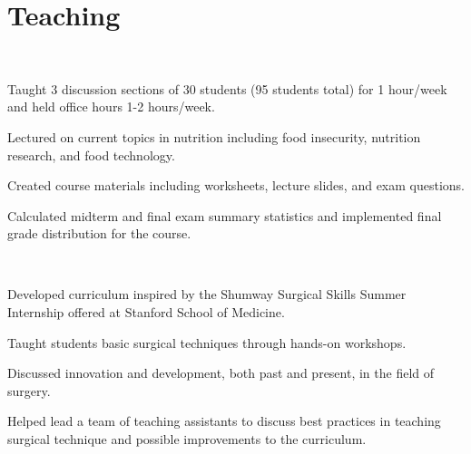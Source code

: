 
\section{Teaching}

\\
\begin{tightemize}
\item Taught 3 discussion sections of 30 students (95 students total) for 1 hour/week and held office hours 1-2 hours/week.
\item Lectured on current topics in nutrition including food insecurity, nutrition research, and food technology.
\item Created course materials including worksheets, lecture slides, and exam questions.
\item Calculated midterm and final exam summary statistics and implemented final grade distribution for the course.
\end{tightemize}
\sectionsep

\\
\begin{tightemize}
\item Developed curriculum inspired by the Shumway Surgical Skills Summer Internship offered at Stanford School of Medicine.
\item Taught students basic surgical techniques through hands-on workshops.
\item Discussed innovation and development, both past and present, in the field of surgery.
\item Helped lead a team of teaching assistants to discuss best practices in teaching surgical technique and possible improvements to the curriculum.
\end{tightemize}
\sectionsep

\begin{comment}
\workplace{Asian Health Services}{January 2016 – May 2017}\\
\position{Labor Coach}{Oakland, CA}
\begin{tightemize}
\item Assist families with limited English proficiency during childbirth as a patient advocate and translator.
\item Champion importance of communication between patients and healthcare professionals, especially in addressing cultural needs and customs.
\end{tightemize}
\sectionsep
\end{comment}

